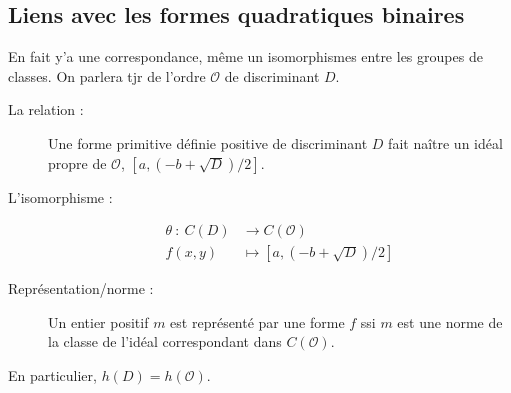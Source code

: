 \documentclass[12pt]{article}
\theoremstyle{plain}
\newcommand{\Or}{\mathcal{O}}
\begin{document}
\subsection{Liens avec les formes quadratiques binaires}
En fait y'a une correspondance, même un isomorphismes entre les groupes de classes. On parlera tjr de l'ordre $\Or$ de discriminant $D$.
\begin{description}
    \item[La relation :] Une forme primitive définie positive de discriminant $D$ fait naître un idéal propre de $\Or$, $[a, (-b+\sqrt{D})/2]$.
    \item[L'isomorphisme :]
    \begin{align*}
        \theta~:~C(D)&\rightarrow C(\Or)\\
        f(x,y)&\mapsto [a, (-b+\sqrt{D})/2]
    \end{align*}
    \item[Représentation/norme :] Un entier positif $m$ est représenté par une forme $f$ ssi $m$ est une norme de la classe de l'idéal correspondant dans $C(\Or)$.
\end{description}

En particulier, $h(D)=h(\Or)$. 
\end{document}
